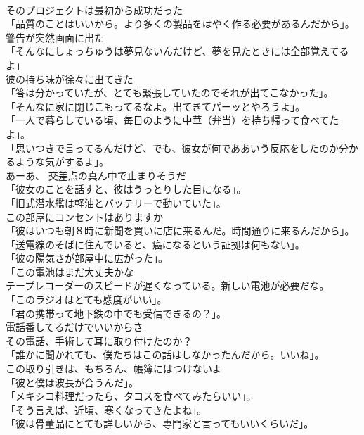 \documentclass[8pt]{extreport}
\begin{document}
\begin{CJK}{UTF8}{min}
\\	そのプロジェクトは最初から成功だった	
\\	「品質のことはいいから。より多くの製品をはやく作る必要があるんだから」。	
\\	警告が突然画面に出た	
\\	「そんなにしょっちゅうは夢見ないんだけど、夢を見たときには全部覚えてるよ」	
\\	彼の持ち味が徐々に出てきた	
\\	「答は分かっていたが、とても緊張していたのでそれが出てこなかった」。	
\\	「そんなに家に閉じこもってるなよ。出てきてパーッとやろうよ」。	
\\	「一人で暮らしている頃、毎日のように中華（弁当）を持ち帰って食べてたよ」。	
\\	「思いつきで言ってるんだけど、でも、彼女が何でああいう反応をしたのか分かるような気がするよ」。	
\\	あーあ、 交差点の真ん中で止まりそうだ	
\\	「彼女のことを話すと、彼はうっとりした目になる」。	
\\	「旧式潜水艦は軽油とバッテリーで動いていた」。	
\\	この部屋にコンセントはありますか	
\\	「彼はいつも朝８時に新聞を買いに店に来るんだ。時間通りに来るんだから」。	
\\	「送電線のそばに住んでいると、癌になるという証拠は何もない」。	
\\	「彼の陽気さが部屋中に広がった」。	
\\	「この電池はまだ大丈夫かな	
\\	テープレコーダーのスピードが遅くなっている。新しい電池が必要だな。	
\\	「このラジオはとても感度がいい」。	
\\	「君の携帯って地下鉄の中でも受信できるの？」。	
\\	電話番してるだけでいいからさ	
\\	その電話、手術して耳に取り付けたのか？	
\\	「誰かに聞かれても、僕たちはこの話はしなかったんだから。いいね」。	
\\	この取り引きは、もちろん、帳簿にはつけないよ	
\\	「彼と僕は波長が合うんだ」。	
\\	「メキシコ料理だったら、タコスを食べてみたらいい」。	
\\	「そう言えば、近頃、寒くなってきたよね」。	
\\	「彼は骨董品にとても詳しいから、専門家と言ってもいいくらいだ」。	

\end{CJK}
\end{document}

